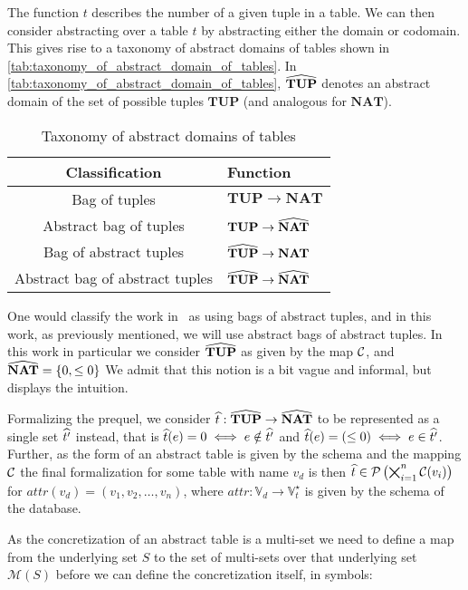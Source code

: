 The function $t$ describes the number of a given tuple in a table.
We can then consider abstracting over a table $t$ by abstracting either the domain or codomain.
This gives rise to a taxonomy of abstract domains of tables shown in \autoref{tab:taxonomy_of_abstract_domain_of_tables}.
In \autoref{tab:taxonomy_of_abstract_domain_of_tables}, $\widehat{\mathbf{TUP}}$ denotes an abstract domain of the set of possible tuples $\mathbf{TUP}$ (and analogous for $\mathbf{NAT}$).


\begin{table}
    \caption{Taxonomy of abstract domains of tables}
    \centering
    \begin{tabular}{c|l}
    Classification & Function \\
    \hline
    \hline
        Bag of tuples & $\mathbf{TUP} \rightarrow \mathbf{NAT}$ \\
        Abstract bag of tuples & $\mathbf{TUP} \rightarrow \widehat{\mathbf{NAT}}$ \\
        Bag of abstract tuples & $\widehat{\mathbf{TUP}} \rightarrow \mathbf{NAT}$ \\
        Abstract bag of abstract tuples & $\widehat{\mathbf{TUP}} \rightarrow \widehat{\mathbf{NAT}}$ \\
    \end{tabular}
    \label{tab:taxonomy_of_abstract_domain_of_tables}
\end{table}

One would classify the work in~\cite{halder_abstract_2012} as using bags of abstract tuples, and in this work, as previously mentioned, we will use abstract bags of abstract tuples.
In this work in particular we consider $\widehat{\mathbf{TUP}}$ as given by the map $\mathcal{C}$, and $\widehat{\mathbf{NAT}} = \{0, \leq0\}$
We admit that this notion is a bit vague and informal, but displays the intuition.

Formalizing the prequel, we consider $\widehat{t} : \widehat{\mathbf{TUP}} \rightarrow \widehat{\mathbf{NAT}}$ to be represented as a single set $\widehat{t'}$ instead, that is $\widehat{t}({e}) = 0 \iff e \notin \widehat{t'}$ and  $\widehat{t}({e}) = (\leq 0) \iff e \in \widehat{t'}$.
Further, as the form of an abstract table is given by the schema and the mapping $\mathcal{C}$ the final formalization for some table with name $v_d$ is then $\widehat{t} \in \mathcal{P}\left(\bigtimes_{i = 1}^{n}\mathcal{C}(v_i)\right)$ for $attr(v_d) = (v_1, v_2, \dots, v_n)$, where $attr : \mathbb{V}_d \rightarrow \mathbb{V}_t^\star$ is given by the schema of the database.

As the concretization of an abstract table is a multi-set we need to define a map from the underlying set $S$ to the set of multi-sets over that underlying set $\mathcal{M}(S)$ before we can define the concretization itself, in symbols:


